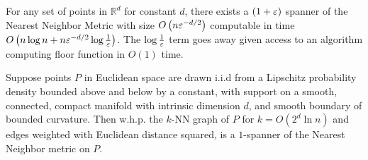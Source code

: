 
\begin{theorem} \label{thm:general-spanner}
  For any set of points in $\mathbb{R}^d$ for constant $d$, there exists a $(1+\varepsilon)$
  spanner of the Nearest Neighbor Metric
  with size $O\left(n\varepsilon^{-d/2} \right)$ computable in time
  $O\left(n \log n + n\varepsilon^{-d/2}\log{\frac{1}{\varepsilon}}\right)$. The
  $\log{\frac{1}{\varepsilon}}$ term goes away given access to an algorithm
computing floor function
in $O(1)$ time.
\end{theorem}

\begin{theorem} \label{thm:distribution-spanner}
Suppose points $P$ in Euclidean space are drawn i.i.d from a Lipschitz probability density bounded
above and below by a constant, with support on a
smooth, connected, compact manifold with intrinsic dimension $d$,
  and smooth
  boundary of bounded curvature. Then w.h.p. the $k$-NN graph of
  $P$ for $k = O(2^d \ln n)$ and edges weighted with Euclidean
  distance squared, is a $1$-spanner of the Nearest Neighbor
  metric on $P$.
\end{theorem}
